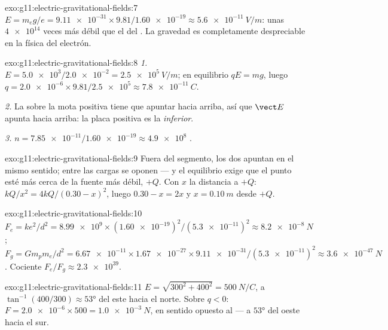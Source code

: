 \begin{solution}{exo:g11:electric-gravitational-fields:7}
$E = m_e g / e = \num{9.11e-31} \times 9.81 / \num{1.60e-19}
\approx \qty{5.6e-11}{V/m}$: unas $\num{4e14}$ veces más débil que el
 del . La gravedad es completamente despreciable en la
física del electrón.
\end{solution}

\begin{solution}{exo:g11:electric-gravitational-fields:8}
\emph{1.} $E = \num{5.0e3} / \num{2.0e-2} = \qty{2.5e5}{V/m}$; en
equilibrio $qE = mg$, luego
$q = \num{2.0e-6} \times 9.81 / \num{2.5e5} \approx \qty{7.8e-11}{C}$.

\emph{2.} La  sobre la mota positiva tiene que apuntar hacia
arriba, así que $\vect E$ apunta hacia arriba: la placa positiva es la
\emph{inferior}.

\emph{3.} $n = \num{7.85e-11} / \num{1.60e-19} \approx \num{4.9e8}$
.
\end{solution}

\begin{solution}{exo:g11:electric-gravitational-fields:9}
Fuera del segmento, los dos  apuntan en el mismo sentido; entre
las cargas se oponen --- y el equilibrio exige que el punto esté más
cerca de la fuente más débil, $+Q$. Con $x$ la distancia a $+Q$:
$kQ/x^2 = 4kQ/(0.30 - x)^2$, luego $0.30 - x = 2x$ y
$x = \qty{0.10}{m}$ desde $+Q$.
\end{solution}

\begin{solution}{exo:g11:electric-gravitational-fields:10}
$F_e = ke^2/d^2 = \num{8.99e9} \times (\num{1.60e-19})^2 /
(\num{5.3e-11})^2 \approx \qty{8.2e-8}{N}$;
$F_g = G m_p m_e / d^2 = \num{6.67e-11} \times \num{1.67e-27} \times
\num{9.11e-31} / (\num{5.3e-11})^2 \approx \qty{3.6e-47}{N}$. Cociente
$F_e / F_g \approx \num{2.3e39}$.
\end{solution}

\begin{solution}{exo:g11:electric-gravitational-fields:11}
$E = \sqrt{300^2 + 400^2} = \qty{500}{N/C}$, a
$\tan^{-1}(400/300) \approx \ang{53}$ del este hacia el norte. Sobre
$q < 0$: $F = \num{2.0e-6} \times 500 = \qty{1.0e-3}{N}$, en sentido
opuesto al  --- a $\ang{53}$ del oeste hacia el sur.
\end{solution}


